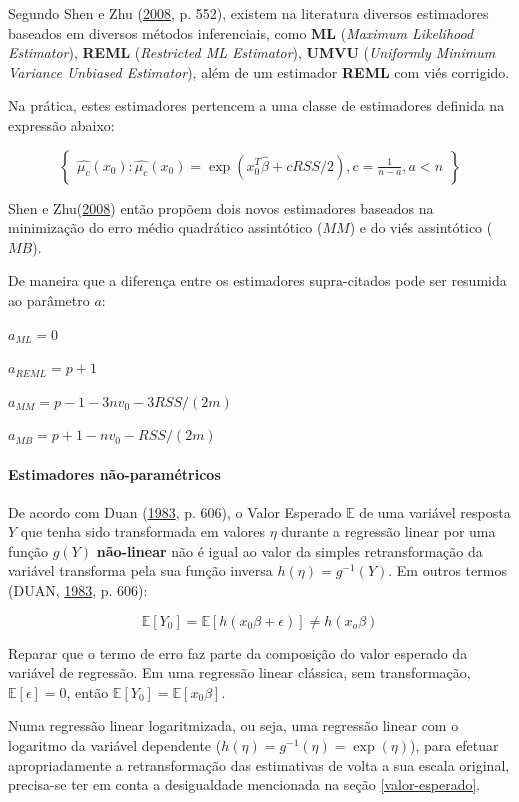 \documentclass[a4paper, 12pt]{article}
\let\oldparagraph\paragraph
\renewcommand{\paragraph}[1]{\oldparagraph{#1}\mbox{}}
\begin{document}
Segundo Shen e Zhu (\protect\hyperlink{ref-shen}{2008}, p. 552), existem
na literatura diversos estimadores baseados em diversos métodos
inferenciais, como \textbf{ML} (\emph{Maximum Likelihood Estimator}),
\textbf{REML} (\emph{Restricted ML Estimator}), \textbf{UMVU}
(\emph{Uniformly Minimum Variance Unbiased Estimator}), além de um
estimador \textbf{REML} com viés corrigido.

Na prática, estes estimadores pertencem a uma classe de estimadores
definida na expressão abaixo:

\[\begin{Bmatrix}
\hat{\mu_c}(x_0):\hat{\mu_c}(x_0) = \exp(x_0^T\hat{\beta} + cRSS/2), c = \frac{1}{n-a}, a<n
\end{Bmatrix}\]

Shen e Zhu(\protect\hyperlink{ref-shen}{2008}) então propõem dois novos
estimadores baseados na minimização do erro médio quadrático assintótico
(\(MM\)) e do viés assintótico (\(MB\)).

De maneira que a diferença entre os estimadores supra-citados pode ser
resumida ao parâmetro \(a\):

\(a_{ML} = 0\)

\(a_{REML} = p+1\)

\(a_{MM} = p - 1 - 3nv_0 - 3RSS/(2m)\)

\(a_{MB} = p + 1 - nv_0 - RSS/(2m)\)

\paragraph{Estimadores
não-paramétricos}\label{estimadores-nao-parametricos}

De acordo com Duan (\protect\hyperlink{ref-Duan}{1983}, p. 606), o Valor
Esperado \(\mathbb{E}\) de uma variável resposta \(Y\) que tenha sido
transformada em valores \(\eta\) durante a regressão linear por uma
função \(g(Y)\) \textbf{não-linear} não é igual ao valor da simples
retransformação da variável transforma pela sua função inversa
\(h(\eta) = g^{-1}(Y)\). Em outros termos (DUAN,
\protect\hyperlink{ref-Duan}{1983}, p. 606):

\[\mathbb{E}[Y_0] = \mathbb{E}[h(x_0\beta + \epsilon)] \ne h(x_o\beta)\]

Reparar que o termo de erro faz parte da composição do valor esperado da
variável de regressão. Em uma regressão linear clássica, sem
transformação, \(\mathbb{E}[\epsilon] = 0\), então
\(\mathbb{E}[Y_0] = \mathbb{E}[x_0\beta]\).

Numa regressão linear logaritmizada, ou seja, uma regressão linear com o
logaritmo da variável dependente
(\(h(\eta) = g^{-1}(\eta) = \exp(\eta)\)), para efetuar apropriadamente
a retransformação das estimativas de volta a sua escala original,
precisa-se ter em conta a desigualdade mencionada na seção
\ref{valor-esperado}.
\end{document}
